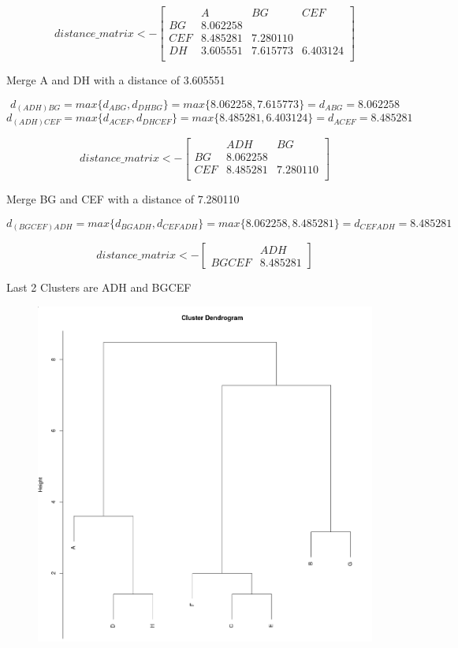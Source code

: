\documentclass{report}
\begin{document}
\[
  distance\_matrix <- 
  \begin{bmatrix}
         & A        & BG       & CEF     \\
    BG   & 8.062258 &          &         \\
    CEF  & 8.485281 & 7.280110 &          \\
    DH   & 3.605551 & 7.615773 & 6.403124 \\
  \end{bmatrix}
\]

Merge A and DH with a distance of 3.605551

\begin{equation}
  d_{(ADH)BG} = max\{d_{ABG}, d_{DHBG}\} = max\{8.062258, 7.615773\} = d_{ABG} = 8.062258
\end{equation}
\begin{equation}
  d_{(ADH)CEF} = max\{d_{ACEF}, d_{DHCEF}\} = max\{8.485281, 6.403124\} = d_{ACEF} = 8.485281
\end{equation}

\[
  distance\_matrix <- 
  \begin{bmatrix}
         & ADH        & BG     \\
    BG   & 8.062258 &          \\
    CEF  & 8.485281 & 7.280110 \\
  \end{bmatrix}
\]

Merge BG and CEF with a distance of 7.280110

\begin{equation}
  d_{(BGCEF)ADH} = max\{d_{BGADH}, d_{CEFADH}\} = max\{8.062258, 8.485281\} = d_{CEFADH} = 8.485281
\end{equation}

\[
  distance\_matrix <- 
  \begin{bmatrix}
          & ADH       \\
    BGCEF & 8.485281
  \end{bmatrix}
\]

Last 2 Clusters are ADH and BGCEF

\begin{figure}[H]
  \includegraphics[width=\linewidth]{ClusterDendrogram.png}
\end{figure}
\end{document}
